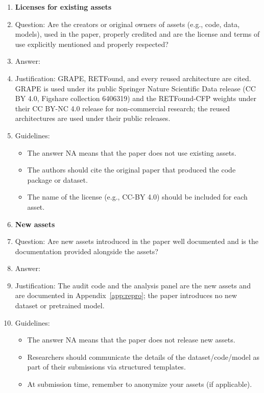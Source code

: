 \begin{enumerate}
\item {\bf Licenses for existing assets}
    \item[] Question: Are the creators or original owners of assets (e.g., code, data, models), used in the paper, properly credited and are the license and terms of use explicitly mentioned and properly respected?
    \item[] Answer: \answerYes{}
    \item[] Justification: GRAPE, RETFound, and every reused architecture are cited. GRAPE is used under its public Springer Nature Scientific Data release (CC BY 4.0, Figshare collection 6406319) and the RETFound-CFP weights under their CC BY-NC 4.0 release for non-commercial research; the reused architectures are used under their public releases.
    \item[] Guidelines:
    \begin{itemize}
        \item The answer NA means that the paper does not use existing assets.
        \item The authors should cite the original paper that produced the code package or dataset.
        \item The name of the license (e.g., CC-BY 4.0) should be included for each asset.
    \end{itemize}

\item {\bf New assets}
    \item[] Question: Are new assets introduced in the paper well documented and is the documentation provided alongside the assets?
    \item[] Answer: \answerYes{}
    \item[] Justification: The audit code and the analysis panel are the new assets and are documented in Appendix~\ref{app:repro}; the paper introduces no new dataset or pretrained model.
    \item[] Guidelines:
    \begin{itemize}
        \item The answer NA means that the paper does not release new assets.
        \item Researchers should communicate the details of the dataset/code/model as part of their submissions via structured templates.
        \item At submission time, remember to anonymize your assets (if applicable).
    \end{itemize}


\end{enumerate}
